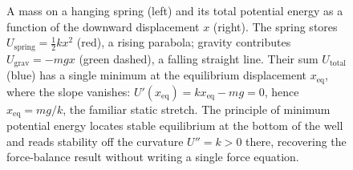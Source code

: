 \begin{figure}[htbp]
\caption[Equilibrium as the minimum of total potential energy]{A mass on
a hanging spring (left) and its total potential energy as a function of
the downward displacement $x$ (right). The spring stores
$U_\mathrm{spring}=\tfrac12 k x^2$ (red), a rising parabola; gravity
contributes $U_\mathrm{grav}=-mgx$ (green dashed), a falling straight
line. Their sum $U_\mathrm{total}$ (blue) has a single minimum at the
equilibrium displacement $x_\mathrm{eq}$, where the slope vanishes:
$U'(x_\mathrm{eq}) = k x_\mathrm{eq} - mg = 0$, hence $x_\mathrm{eq} =
mg/k$, the familiar static stretch. The principle of minimum potential
energy locates stable equilibrium at the bottom of the well and reads
stability off the curvature $U'' = k > 0$ there, recovering the
force-balance result without writing a single force equation.}
\label{fig:vol03ch05:min-pe-springs}
\end{figure}
